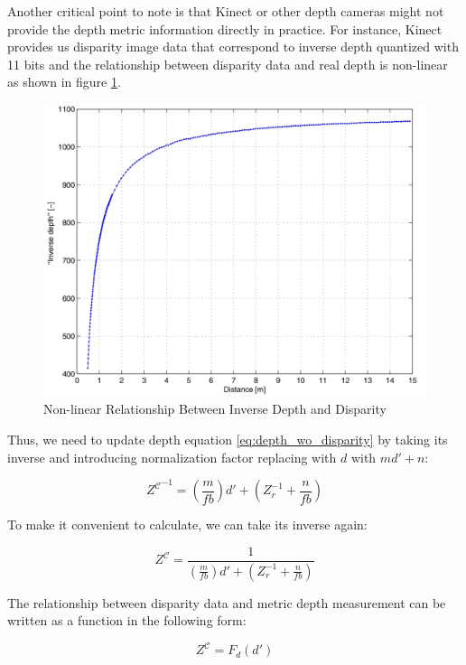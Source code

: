 \documentclass[a4paper]{report}
\numberwithin{figure}{section}
\begin{document}
Another critical point to note is that Kinect or other depth cameras might not 
provide the depth metric information directly in practice. For instance, 
Kinect provides us disparity image data that correspond to inverse depth 
quantized with 11 bits and the relationship between disparity data and real 
depth is non-linear as shown in figure \ref{fig:depth_disparity_relation}.

\begin{figure}[H]
	\centering
  \includegraphics[width=0.6\linewidth,natwidth=640,natheight=640]
  {fig/ref_imgs/depth_disparity_relation.png}
  \caption[Relationship Between Inverse Depth and Disparity]{Non-linear 
  Relationship Between Inverse Depth and Disparity \parencite{Smisek2011}}
	\label{fig:depth_disparity_relation}
\end{figure}

Thus, we need to update depth equation \eqref{eq:depth_wo_disparity} by taking 
its inverse and introducing normalization factor replacing with $d$ with 
$md'+n$:

\begin{equation}\label{eq:depth_w_disparity_reverse}
  {Z^{\mathcal{C}}}^{-1} = (\frac{m}{fb})d' + (Z_r^{-1} + \frac{n}{fb})
\end{equation}

To make it convenient to calculate, we can take its inverse again:

\begin{equation}\label{eq:depth_w_disparity}
  Z^{\mathcal{C}} = \frac{1}{(\frac{m}{fb})d' + (Z_r^{-1} + \frac{n}{fb})}
\end{equation}

The relationship between disparity data and metric depth measurement can be 
written as a function in the following form:

\begin{equation}\label{eq:ir_cam_proj_func}
  Z^{\mathcal{C}}
  =
  F_d(d')
\end{equation} 
\end{document}
